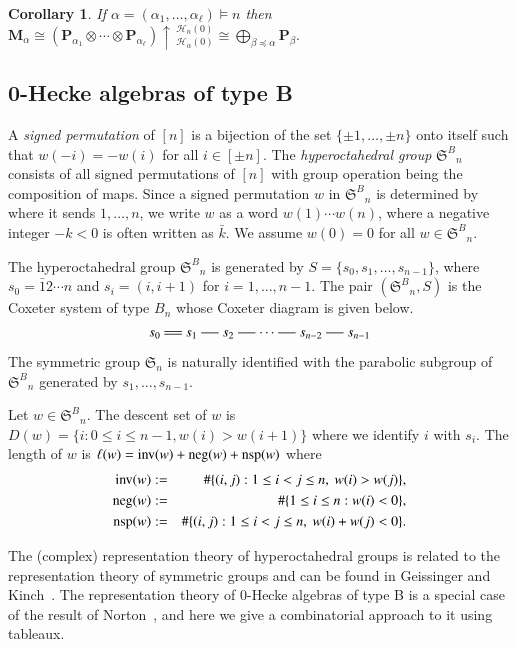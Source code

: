 \documentclass{amsart}
\newtheorem{corollary}[theorem]{Corollary}
\newtheorem*{Young's Rule}{Young's Rule}
\theoremstyle{definition}
\theoremstyle{remark}
\numberwithin{equation}{section}
\begin{document}
\begin{corollary}
If $\alpha=(\alpha_1,\ldots,\alpha_\ell)\models n$ then  ${\mathbf{M}}_\alpha\cong \left( {\mathbf{P}}_{\alpha_1} \otimes\cdots \otimes {\mathbf{P}}_{\alpha_\ell} \right) \uparrow\,_{{\mathcal{H}}_\alpha(0)}^{{\mathcal{H}}_n(0)} \cong \bigoplus_{\beta{\operatorname{\preccurlyeq}}\alpha} {\mathbf{P}}_\beta.$
\end{corollary}

\subsection{0-Hecke algebras of type B}\label{sec:H0B}

A \emph{signed permutation} of $[n]$ is a bijection of the set $\{\pm1,\ldots,\pm n\}$ onto itself such that $w(-i)=-w(i)$ for all $i\in[\pm n]$. The \emph{hyperoctahedral group} ${{\mathfrak S}^B}_n$ consists of all signed permutations of $[n]$ with group operation being the composition of maps. Since a signed permutation $w$ in ${{\mathfrak S}^B}_n$ is determined by where it sends $1,\ldots,n$, we write $w$ as a word $w(1)\cdots w(n)$, where a negative integer $-k<0$ is often written as $\bar k$. We assume $w(0)=0$ for all $w\in{{\mathfrak S}^B}_n$.

The hyperoctahedral group ${{\mathfrak S}^B}_n$ is generated by $S=\{s_0,s_1,\ldots,s_{n-1}\}$, where $s_0=\bar12\cdots n$ and $s_i=(i,i+1)$ for $i=1,\ldots,n-1$. The pair $({{\mathfrak S}^B}_n,S)$ is the Coxeter system of type $B_n$ whose Coxeter diagram is given below.
\[
\xymatrix @C=12pt{
s_0 \ar@{=}[r] & s_1 \ar@{-}[r] & s_2 \ar@{-}[r] & \cdots \ar@{-}[r] & s_{n-2} \ar@{-}[r] & s_{n-1}
}
\]
The symmetric group ${{\mathfrak S}}_n$ is naturally identified with the parabolic subgroup of ${{\mathfrak S}^B}_n$ generated by $s_1,\ldots,s_{n-1}$. 

Let $w\in {{\mathfrak S}^B}_n$. The descent set of $w$ is $D(w)=\{i:0\leq i\leq n-1, w(i)>w(i+1)\}$ where we identify $i$ with $s_i$. The length of $w$ is $\ell(w)={{\rm inv}}(w)+{\mathrm{neg}}(w)+{\mathrm{nsp}}(w)$ where
\begin{eqnarray*}
{{\rm inv}}(w) &:=& \#\{(i,j):1\leq i<j\leq n,\ w(i)>w(j)\}, \\
{\mathrm{neg}}(w) &:=& \#\{1\leq i\leq n: w(i)<0\}, \\
{\mathrm{nsp}}(w) &:=& \#\{(i,j):1\leq i<j\leq n,\ w(i)+w(j)<0\}.
\end{eqnarray*}

The (complex) representation theory of hyperoctahedral groups is related to the representation theory of symmetric groups and can be found in Geissinger and Kinch~\cite{GeissingerKinch}. The representation theory of 0-Hecke algebras of type B is a special case of the result of Norton~\cite{Norton}, and here we give a combinatorial approach to it using tableaux.
\end{document}
